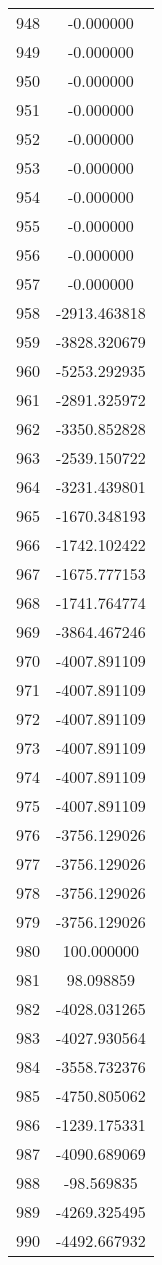 \documentclass[12pt]{article}
\begin{document}
\begin{longtable}{@{}cc@{}}
948 & -0.000000 \\
949 & -0.000000 \\
950 & -0.000000 \\
951 & -0.000000 \\
952 & -0.000000 \\
953 & -0.000000 \\
954 & -0.000000 \\
955 & -0.000000 \\
956 & -0.000000 \\
957 & -0.000000 \\
958 & -2913.463818 \\
959 & -3828.320679 \\
960 & -5253.292935 \\
961 & -2891.325972 \\
962 & -3350.852828 \\
963 & -2539.150722 \\
964 & -3231.439801 \\
965 & -1670.348193 \\
966 & -1742.102422 \\
967 & -1675.777153 \\
968 & -1741.764774 \\
969 & -3864.467246 \\
970 & -4007.891109 \\
971 & -4007.891109 \\
972 & -4007.891109 \\
973 & -4007.891109 \\
974 & -4007.891109 \\
975 & -4007.891109 \\
976 & -3756.129026 \\
977 & -3756.129026 \\
978 & -3756.129026 \\
979 & -3756.129026 \\
980 & 100.000000 \\
981 & 98.098859 \\
982 & -4028.031265 \\
983 & -4027.930564 \\
984 & -3558.732376 \\
985 & -4750.805062 \\
986 & -1239.175331 \\
987 & -4090.689069 \\
988 & -98.569835 \\
989 & -4269.325495 \\
990 & -4492.667932 \\

\end{longtable}
\end{document}

